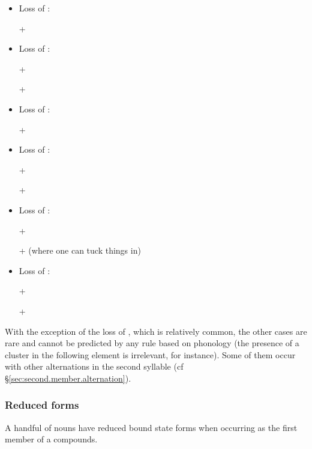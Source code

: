 \begin{itemize}
\item Loss of : 

 +  \fl{}  
\item Loss of : 

 +  \fl{}  

  +  \fl{}  
\item Loss of : 

 +  \fl{}  
\item Loss of :

  +  \fl{}  

 +  \fl{}  
\item Loss of :

  +  \fl{}  
 
 +  \fl{}  (where one can tuck things in) 
\item Loss of : 

 +  \fl{}  

 +  \fl{}  
\end{itemize}

With the exception of the loss of , which is relatively common, the other cases are rare and cannot be predicted by any rule based on phonology (the presence of a cluster in the following element is irrelevant, for instance). Some of them occur with other alternations in the second syllable (cf §\ref{sec:second.member.alternation}).

\subsubsection{Reduced forms} \label{sec:reduced.forms.compounds}  
A handful of nouns have reduced bound state forms when occurring as the first member of a compounds. 

